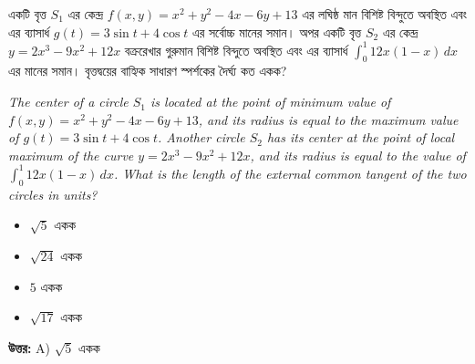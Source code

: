 \documentclass[12pt, a4paper]{article}
\begin{document}
\begin{tcolorbox}[questionbox={প্রশ্ন (Question) 38}]
    \noindent
    একটি বৃত্ত $S_1$ এর কেন্দ্র $f(x, y) = x^2 + y^2 - 4x - 6y + 13$ এর লঘিষ্ঠ মান বিশিষ্ট বিন্দুতে অবস্থিত এবং এর ব্যাসার্ধ $g(t) = 3\sin t + 4\cos t$ এর সর্বোচ্চ মানের সমান। অপর একটি বৃত্ত $S_2$ এর কেন্দ্র $y = 2x^3 - 9x^2 + 12x$ বক্ররেখার গুরুমান বিশিষ্ট বিন্দুতে অবস্থিত এবং এর ব্যাসার্ধ $\int_0^1 12x(1-x) \, dx$ এর মানের সমান। বৃত্তদ্বয়ের বাহ্যিক সাধারণ স্পর্শকের দৈর্ঘ্য কত একক?
    
    \vspace{0.8em}
    \begin{english}
    \noindent\textit{\color{darkgray}
    The center of a circle $S_1$ is located at the point of minimum value of $f(x, y) = x^2 + y^2 - 4x - 6y + 13$, and its radius is equal to the maximum value of $g(t) = 3\sin t + 4\cos t$. Another circle $S_2$ has its center at the point of local maximum of the curve $y = 2x^3 - 9x^2 + 12x$, and its radius is equal to the value of $\int_0^1 12x(1-x) \, dx$. What is the length of the external common tangent of the two circles in units?
    }
    \end{english}
\end{tcolorbox}

\begin{itemize}[label={}, leftmargin=1cm, itemsep=0.5em]
    \item[\textbf{A)}] $\sqrt{5}$ একক
    \item[\textbf{B)}] $\sqrt{24}$ একক
    \item[\textbf{C)}] $5$ একক
    \item[\textbf{D)}] $\sqrt{17}$ একক
\end{itemize}

\vspace{0.5em}
\begin{tcolorbox}[answerbox]
    \textbf{\color{success} উত্তর:} A) $\sqrt{5}$ একক
\end{tcolorbox}
\vspace{1em}
\end{document}
